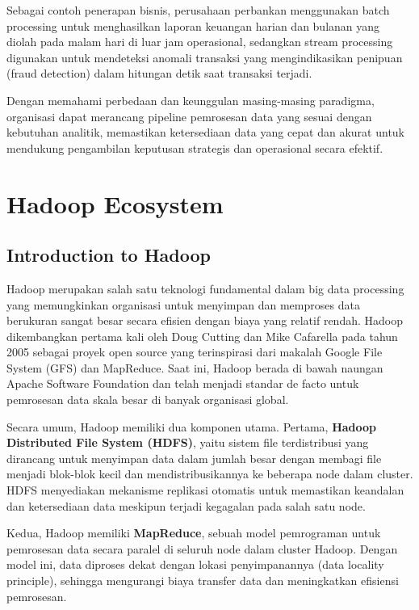 Sebagai contoh penerapan bisnis, perusahaan perbankan menggunakan batch processing untuk menghasilkan laporan keuangan harian dan bulanan yang diolah pada malam hari di luar jam operasional, sedangkan stream processing digunakan untuk mendeteksi anomali transaksi yang mengindikasikan penipuan (fraud detection) dalam hitungan detik saat transaksi terjadi.

Dengan memahami perbedaan dan keunggulan masing-masing paradigma, organisasi dapat merancang pipeline pemrosesan data yang sesuai dengan kebutuhan analitik, memastikan ketersediaan data yang cepat dan akurat untuk mendukung pengambilan keputusan strategis dan operasional secara efektif.


\section{Hadoop Ecosystem}

\subsection{Introduction to Hadoop}

Hadoop merupakan salah satu teknologi fundamental dalam big data processing yang memungkinkan organisasi untuk menyimpan dan memproses data berukuran sangat besar secara efisien dengan biaya yang relatif rendah. Hadoop dikembangkan pertama kali oleh Doug Cutting dan Mike Cafarella pada tahun 2005 sebagai proyek open source yang terinspirasi dari makalah Google File System (GFS) dan MapReduce. Saat ini, Hadoop berada di bawah naungan Apache Software Foundation dan telah menjadi standar de facto untuk pemrosesan data skala besar di banyak organisasi global.

Secara umum, Hadoop memiliki dua komponen utama. Pertama, \textbf{Hadoop Distributed File System (HDFS)}, yaitu sistem file terdistribusi yang dirancang untuk menyimpan data dalam jumlah besar dengan membagi file menjadi blok-blok kecil dan mendistribusikannya ke beberapa node dalam cluster. HDFS menyediakan mekanisme replikasi otomatis untuk memastikan keandalan dan ketersediaan data meskipun terjadi kegagalan pada salah satu node.

Kedua, Hadoop memiliki \textbf{MapReduce}, sebuah model pemrograman untuk pemrosesan data secara paralel di seluruh node dalam cluster Hadoop. Dengan model ini, data diproses dekat dengan lokasi penyimpanannya (data locality principle), sehingga mengurangi biaya transfer data dan meningkatkan efisiensi pemrosesan.

